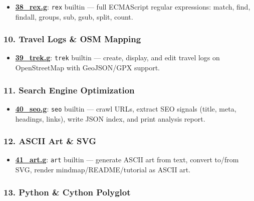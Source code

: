 \documentclass[
]{article}
\providecommand{\tightlist}{%
  \setlength{\itemsep}{0pt}\setlength{\parskip}{0pt}}
\begin{document}
\begin{itemize}
\tightlist
\item
  \textbf{\url{38_rex.g}}: \texttt{rex} builtin --- full ECMAScript
  regular expressions: match, find, findall, groups, sub, gsub, split,
  count.
\end{itemize}

\subsubsection{10. Travel Logs \& OSM
Mapping}\label{travel-logs-osm-mapping}

\begin{itemize}
\tightlist
\item
  \textbf{\url{39_trek.g}}: \texttt{trek} builtin --- create, display,
  and edit travel logs on OpenStreetMap with GeoJSON/GPX support.
\end{itemize}

\subsubsection{11. Search Engine
Optimization}\label{search-engine-optimization}

\begin{itemize}
\tightlist
\item
  \textbf{\url{40_seo.g}}: \texttt{seo} builtin --- crawl URLs, extract
  SEO signals (title, meta, headings, links), write JSON index, and
  print analysis report.
\end{itemize}

\subsubsection{12. ASCII Art \& SVG}\label{ascii-art-svg}

\begin{itemize}
\tightlist
\item
  \textbf{\url{41_art.g}}: \texttt{art} builtin --- generate ASCII art
  from text, convert to/from SVG, render mindmap/README/tutorial as
  ASCII art.
\end{itemize}

\subsubsection{13. Python \& Cython
Polyglot}\label{python-cython-polyglot}
\end{document}
